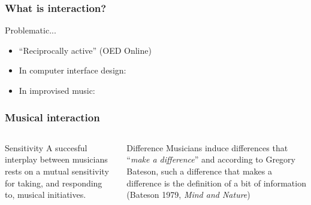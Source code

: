 \documentclass{beamer}
\begin{document}
\begin{frame}
  \frametitle{What is interaction?}
  \pause[2]
    \begin{block}{Problematic...}
      \begin{itemize}
      \item<3-> ``Reciprocally active'' (OED Online)
      \item<4-> In computer interface design: 
      \item<5-> In improvised music: 
      \end{itemize}
    \end{block}
\end{frame}

\begin{frame}
  \frametitle{Musical interaction}
  \begin{block}{}
    \begin{columns}[t]
      \begin{block}{Sensitivity}
        A succesful interplay between musicians rests on a mutual sensitivity
        for taking, and responding to, musical initiatives.
      \end{block}
      \pause[2] 
      \begin{block}{Difference}
          Musicians induce differences that ``\emph{make a difference}'' and
          according to Gregory Bateson, such a difference that makes a
          difference is the definition of a bit of information (Bateson 1979, \emph{Mind and Nature})
      \end{block}
    \end{columns}
  \end{block}
\end{frame}
\end{document}
